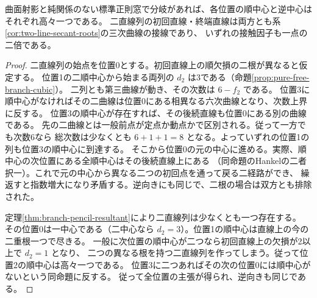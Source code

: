 \begin{theorem}\label{thm:two-line-double-tangency}
曲面射影と純関係のない標準正則窓で分岐があれば、各位置の順中心と逆中心はそれぞれ高々一つである。
二直線列の初回直線・終端直線は両方とも系\ref{cor:two-line-secant-roots}の三次曲線の接線であり、
いずれの接触因子も一点の二倍である。
\end{theorem}
\begin{proof}
二直線列の始点を位置0とする。初回直線上の順欠損の二根が異なると仮定する。
位置1の二順中心から始まる両列の $d_2$ は3である（命題\ref{prop:pure-free-branch-cubic}）。
二列とも第三曲線が動き、その次数は $6-f_2$ である。
位置3に順中心がなければその二曲線は位置0にある相異なる六次曲線となり、次数上界に反する。
位置3の順中心が存在すれば、その後続直線も位置0にある別の曲線である。
先の二曲線とは一般前点が定点か動点かで区別される。従って一方でも次数6なら
総次数は少なくとも $6+1+1=8$ となる。よっていずれの位置1の列も位置3の順中心に到達する。
そこから位置0の元の中心に進める。実際、順中心の次位置にある全順中心はその後続直線上にある
（同命題のHankelの二者択一）。これで元の中心から異なる二つの初回点を通って戻る二経路ができ、
繰返すと指数増大になり矛盾する。逆向きにも同じで、二根の場合は双方とも排除された。

定理\ref{thm:branch-pencil-resultant}により二直線列は少なくとも一つ存在する。
その位置0は一中心である（二中心なら $d_2=3$）。位置1の順中心は直線上の今の二重根一つで尽きる。
一般に次位置の順中心が二つなら初回直線上の欠損が2以上で $d_2=1$ となり、
二つの異なる根を持つ二直線列を作ってしまう。従って位置2の順中心は高々一つである。
位置3に二つあればその次の位置0には順中心がないという同命題に反する。
従って全位置の主張が得られ、逆向きも同じである。
\end{proof}

